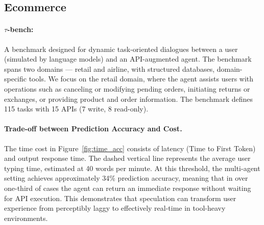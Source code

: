 \subsection{Ecommerce}

\paragraph{$\tau$-bench:} A benchmark designed for dynamic task-oriented dialogues between a user (simulated by language models) and an API-augmented agent. The benchmark spans two domains — retail and airline, with structured databases, domain-specific tools. We focus on the retail domain, where the agent assists users with operations such as canceling or modifying pending orders, initiating returns or exchanges, or providing product and order information. The benchmark defines 115 tasks with 15 APIs (7 write, 8 read-only).

\paragraph{Trade-off between Prediction Accuracy and Cost.}
The time cost in Figure~\ref{fig:time_acc} consists of latency (Time to First Token) and output response time. The dashed vertical line represents the average user typing time, estimated at 40 words per minute. At this threshold, the multi-agent setting achieves approximately 34\% prediction accuracy, meaning that in over one-third of cases the agent can return an immediate response without waiting for API execution. This demonstrates that speculation can transform user experience from perceptibly laggy to effectively real-time in tool-heavy environments.

